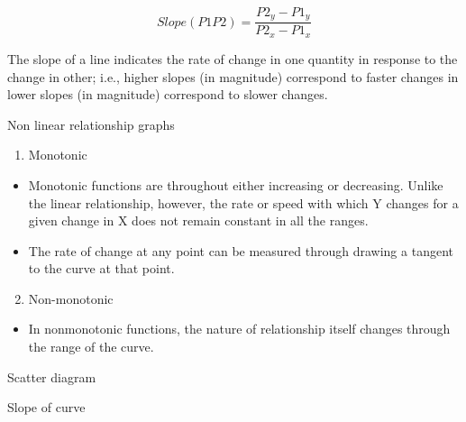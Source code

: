 \documentclass[12pt,ignorenonframetext,aspectratio=169]{beamer}
\providecommand{\tightlist}{%
  \setlength{\itemsep}{0pt}\setlength{\parskip}{0pt}}
\begin{document}
\begin{frame}{}
\protect\hypertarget{section-12}{}

\[
Slope(P1P2) = \frac{P2_y - P1_y}{P2_x - P1_x}
\]

The slope of a line indicates the rate of change in one quantity in
response to the change in other; i.e., higher slopes (in magnitude)
correspond to faster changes in lower slopes (in magnitude) correspond
to slower changes.

\end{frame}

\begin{frame}{Non linear relationship graphs}
\protect\hypertarget{non-linear-relationship-graphs}{}

\begin{enumerate}
\tightlist
\item
  Monotonic
\end{enumerate}

\begin{itemize}
\tightlist
\item
  Monotonic functions are throughout either increasing or decreasing.
  Unlike the linear relationship, however, the rate or speed with which
  Y changes for a given change in X does not remain constant in all the
  ranges.
\item
  The rate of change at any point can be measured through drawing a
  tangent to the curve at that point.
\end{itemize}

\begin{enumerate}
\setcounter{enumi}{1}
\tightlist
\item
  Non-monotonic
\end{enumerate}

\begin{itemize}
\tightlist
\item
  In nonmonotonic functions, the nature of relationship itself changes
  through the range of the curve.
\end{itemize}

\end{frame}

\begin{frame}{Scatter diagram}
\protect\hypertarget{scatter-diagram}{}

\end{frame}

\begin{frame}{Slope of curve}
\protect\hypertarget{slope-of-curve}{}

\end{frame}
\end{document}

